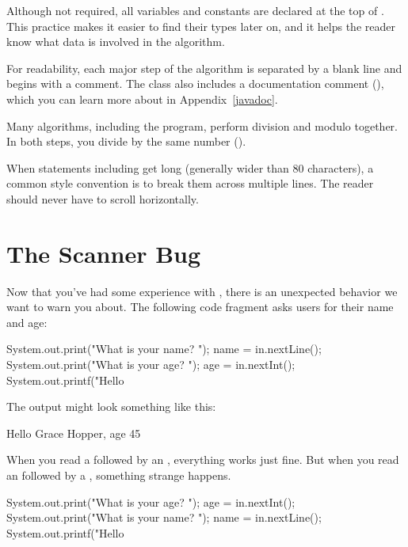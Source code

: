 Although not required, all variables and constants are declared at the top of .
This practice makes it easier to find their types later on, and it helps the reader know what data is involved in the algorithm.


For readability, each major step of the algorithm is separated by a blank line and begins with a comment.
The class also includes a documentation comment (\java{/**}), which you can learn more about in Appendix~\ref{javadoc}.

Many algorithms, including the  program, perform division and modulo together.
In both steps, you divide by the same number ().

When statements including  get long (generally wider than 80 characters), a common style convention is to break them across multiple lines.
The reader should never have to scroll horizontally.


\section{The Scanner Bug}

Now that you've had some experience with , there is an unexpected behavior we want to warn you about.
The following code fragment asks users for their name and age:

\begin{code}
System.out.print("What is your name? ");
name = in.nextLine();
System.out.print("What is your age? ");
age = in.nextInt();
System.out.printf("Hello %
\end{code}

The output might look something like this:

\begin{stdout}
Hello Grace Hopper, age 45
\end{stdout}

When you read a  followed by an , everything works just fine.
But when you read an  followed by a , something strange happens.

\begin{code}
System.out.print("What is your age? ");
age = in.nextInt();
System.out.print("What is your name? ");
name = in.nextLine();
System.out.printf("Hello %
\end{code}


